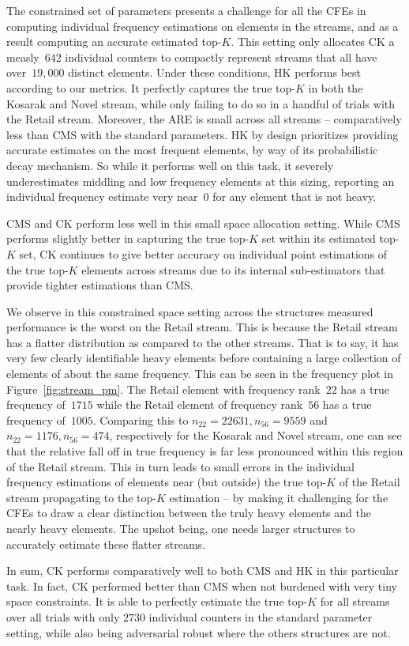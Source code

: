 The constrained set of parameters presents a challenge for all the CFEs in computing individual frequency estimations on elements in the streams, and as a result computing an accurate estimated top-$K$. This setting only allocates CK a measly~$642$ individual counters to compactly represent streams that all have over~$19,000$ distinct elements. Under these conditions, HK performs best according to our metrics. It perfectly captures the true top-$K$ in both the Kosarak and Novel stream, while only failing to do so in a handful of trials with the Retail stream. Moreover, the ARE is small across all streams -- comparatively less than CMS with the standard parameters. HK by design prioritizes providing accurate estimates on the most frequent elements, by way of its probabilistic decay mechanism. So while it performs well on this task, it severely underestimates middling and low frequency elements at this sizing, reporting an individual frequency estimate very near~$0$ for any element that is not heavy. %

 CMS and CK perform less well in this small space allocation setting. While CMS performs slightly better in capturing the true top-$K$ set within its estimated top-$K$ set, CK continues to give better accuracy on individual point estimations of the true top-$K$ elements across streams due to its internal sub-estimators that provide tighter estimations than CMS.

We observe in this constrained space setting across the structures measured performance is the worst on the Retail stream. This is because the Retail stream has a flatter distribution as compared to the other streams. That is to say, it has very few clearly identifiable heavy elements before containing a large collection of elements of about the same frequency. This can be seen in the frequency plot in Figure~\ref{fig:stream_pm}. The Retail element with frequency rank~$22$ has a true frequency of~$1715$ while the Retail element of frequency rank~$56$ has a true frequency of~$1005$. Comparing this to $n_{22} = 22631, n_{56} = 9559$ and~$n_{22} = 1176, n_{56} = 474$, respectively for the Kosarak and Novel stream, one can see that the relative fall off in true frequency is far less pronounced within this region of the Retail stream. This in turn leads to small errors in the individual frequency estimations of elements near (but outside) the true top-$K$ of the Retail stream propagating to the top-$K$ estimation -- by making it challenging for the CFEs to draw a clear distinction between the truly heavy elements and the nearly heavy elements. The upshot being, one needs larger structures to accurately estimate these flatter streams.

In sum, CK performs comparatively well to both CMS and HK in this particular task. In fact, CK performed better than CMS when not burdened with very tiny space constraints. It is able to perfectly estimate the true top-$K$ for all streams over all trials with only $2730$ individual counters in the standard parameter setting, while also being adversarial robust where the others structures are not. 


